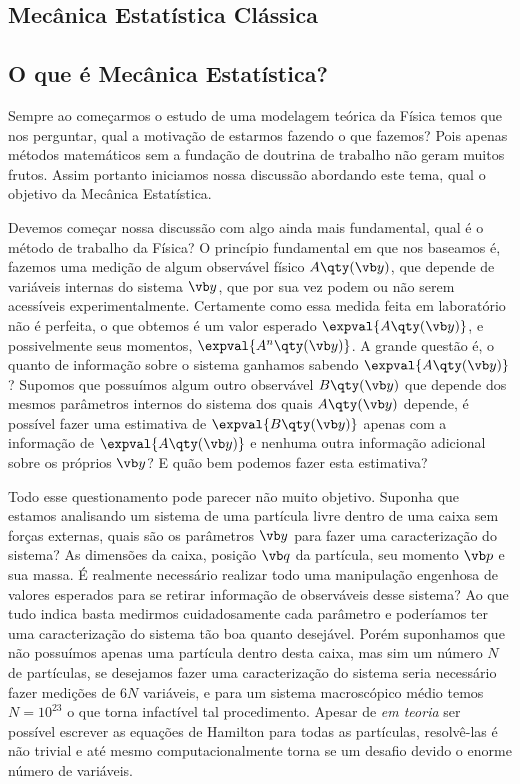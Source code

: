 \documentclass[twoside,reqno]{amsart}
\numberwithin{equation}{section}
\begin{document}
\begin{refsection}
\section{Mecânica Estatística Clássica}

\subsection{O que é Mecânica Estatística?}

Sempre ao começarmos o estudo de uma modelagem teórica da Física temos que nos perguntar, qual a motivação de estarmos fazendo o que fazemos? Pois apenas métodos matemáticos sem a fundação de doutrina de trabalho não geram muitos frutos. Assim portanto iniciamos nossa discussão abordando este tema, qual o objetivo da Mecânica Estatística.

Devemos começar nossa discussão com algo ainda mais fundamental, qual é o método de trabalho da Física? O princípio fundamental em que nos baseamos é, fazemos uma medição de algum observável físico $A\qty(\vb y)$, que depende de variáveis internas do sistema $\vb y$, que por sua vez podem ou não serem acessíveis experimentalmente. Certamente como essa medida feita em laboratório não é perfeita, o que obtemos é um valor esperado $\expval{A\qty(\vb y)}$, e possivelmente seus momentos, $\expval{A^n\qty(\vb y)}$. A grande questão é, o quanto de informação sobre o sistema ganhamos sabendo $\expval{A\qty(\vb y)}$? Supomos que possuímos algum outro observável $B\qty(\vb y)$ que depende dos mesmos parâmetros internos do sistema dos quais $A\qty(\vb y)$ depende, é possível fazer uma estimativa de $\expval{B\qty(\vb y)}$ apenas com a informação de $\expval{A\qty(\vb y)}$ e nenhuma outra informação adicional sobre os próprios $\vb y$? E quão bem podemos fazer esta estimativa?

Todo esse questionamento pode parecer não muito objetivo. Suponha que estamos analisando um sistema de uma partícula livre dentro de uma caixa sem forças externas, quais são os parâmetros $\vb y$ para fazer uma caracterização do sistema? As dimensões da caixa, posição $\vb q$ da partícula, seu momento $\vb p$ e sua massa. É realmente necessário realizar todo uma manipulação engenhosa de valores esperados para se retirar informação de observáveis desse sistema? Ao que tudo indica basta medirmos cuidadosamente cada parâmetro e poderíamos ter uma caracterização do sistema tão boa quanto desejável. Porém suponhamos que não possuímos apenas uma partícula dentro desta caixa, mas sim um número $N$ de partículas, se desejamos fazer uma caracterização do sistema seria necessário fazer medições de $6N$ variáveis, e para um sistema macroscópico médio temos $N=10^{23}$ o que torna infactível tal procedimento. Apesar de \emph{em teoria} 
ser possível escrever as equações de Hamilton para todas as partículas, resolvê-las é não trivial e até mesmo computacionalmente torna se um desafio devido o enorme número de variáveis.


\end{refsection}
\end{document}
